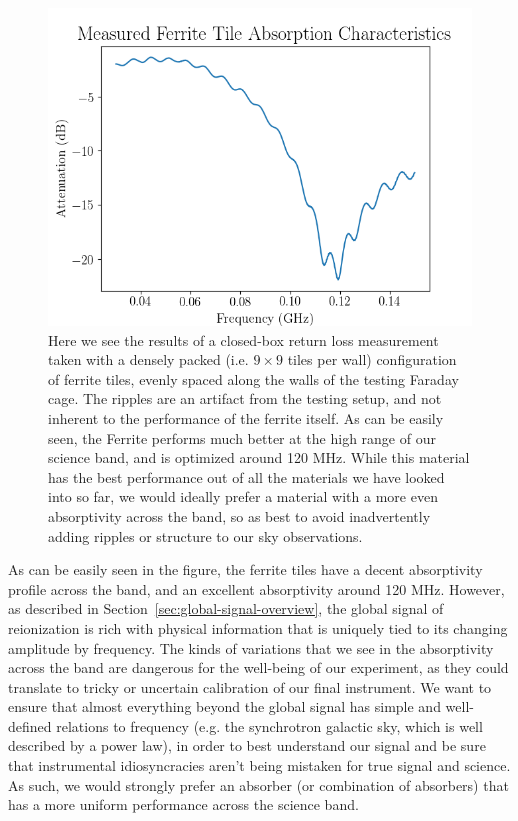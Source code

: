 \begin{figure}
    \begin{center}
    \includegraphics[width=\linewidth]{fe_absorption.png}
    \end{center}
    \caption{
        Here we see the results of a closed-box return loss measurement taken 
        with a densely packed (i.e. $9\times9$ tiles per wall) configuration of 
        ferrite tiles, evenly spaced along the walls of the testing Faraday 
        cage. The ripples are an artifact from the testing setup, and not 
        inherent to the performance of the ferrite itself. As can be easily 
        seen, the Ferrite performs much better at the high range of our science 
        band, and is optimized around 120 MHz.  While this material has the 
        best performance out of all the materials we have looked into so far, 
        we would ideally prefer a material with a more even absorptivity across 
        the band, so as best to avoid inadvertently adding ripples or structure 
        to our sky observations.
    }
    \label{fig:fe-absorption}
\end{figure}

As can be easily seen in the figure, the ferrite tiles have a decent 
absorptivity profile across the band, and an excellent absorptivity around 120 
MHz. However, as described in Section~\ref{sec:global-signal-overview}, the 
global signal of reionization is rich with physical information that is 
uniquely tied to its changing amplitude by frequency. The kinds of variations 
that we see in the absorptivity across the band are dangerous for the 
well-being of our experiment, as they could translate to tricky or uncertain 
calibration of our final instrument. We want to ensure that almost everything 
beyond the global signal has simple and well-defined relations to frequency 
(e.g. the synchrotron galactic sky, which is well described by a power law), in 
order to best understand our signal and be sure that instrumental 
idiosyncracies aren't being mistaken for true signal and science. As such, we 
would strongly prefer an absorber (or combination of absorbers) that has a more 
uniform performance across the science band.


